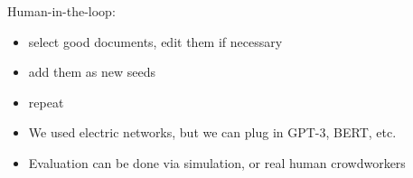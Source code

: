\documentclass[12pt]{beamer}
\begin{document}
\begin{frame}{}
Human-in-the-loop: 
\begin{itemize}
\item select good documents, edit them if necessary
\item add them as new seeds
\item repeat
\end{itemize}
\end{frame}

\begin{frame}{}
\begin{itemize}
\item
We used electric networks, but we can plug in GPT-3, BERT, etc.
\item
Evaluation can be done via simulation, or real human crowdworkers
\end{itemize}
\end{frame}

% 
% 
% 
% 
% 
% 
% 
% 
% 
% 
\end{document}

